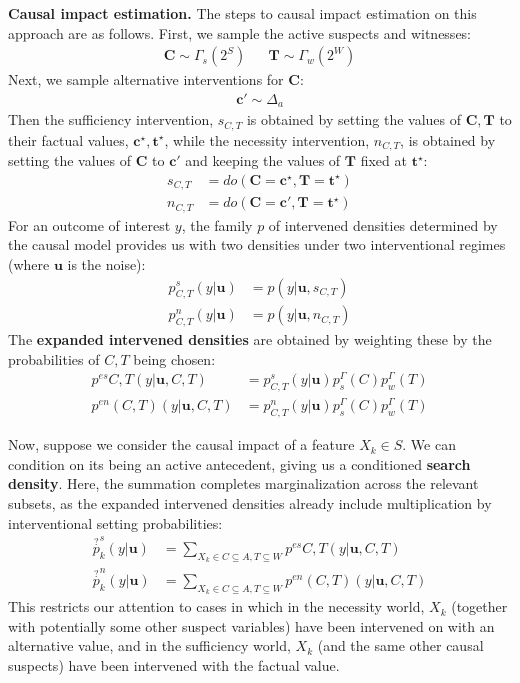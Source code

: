 \documentclass[twoside,11pt]{article}
\begin{document}
\vspace{2mm.}
\noindent \textbf{Causal impact estimation.} 
The steps to causal impact estimation on this approach are as follows. First, we sample the active suspects and witnesses:
\begin{align}
\mathbf{C} \sim \Gamma_s(2^S) & & \mathbf{T} \sim \Gamma_w(2^W)
\end{align}
\noindent Next, we sample alternative interventions for $\mathbf{C}$: 
\begin{align}
\mathbf{c'} \sim \Delta_a
\end{align}
Then the sufficiency intervention, $s_{C,T}$ is obtained by setting the values of $\mathbf{C}, \mathbf{T}$ to their factual values, $\mathbf{c}^\star, \mathbf{t}^\star$, while the necessity intervention, $n_{C, T}$, is obtained by setting the values of $\mathbf{C}$ to $\mathbf{c'}$ and keeping the values of $\mathbf{T}$ fixed at $\mathbf{t}^\star$:
\begin{align}
s_{C,T}  & = do(\mathbf{C} = \mathbf{c^\star}, \mathbf{T} = \mathbf{t^\star}) \\
n_{C,T} & = do(\mathbf{C} = \mathbf{c'}, \mathbf{T} = \mathbf{t^\star})
\end{align}
For an outcome of interest $y$, the family $p$ of intervened densities determined by the causal model provides us with two densities under two interventional regimes (where $\mathbf{u}$ is the noise):
\begin{align}
p^s_{C,T}(y\vert  \mathbf{u}) & = p (y \vert \mathbf{u}, s_{C, T})\\
p^n_{C,T}(y\vert \mathbf{u}) & = p(y \vert \mathbf{u}, n_{C,T})
\end{align} The \textbf{expanded intervened densities} are obtained by weighting these by the probabilities of $C, T$ being chosen:
\begin{align}
p^{es}{C,T}(y \vert \mathbf{u}, C, T) & = p^s_{C,T}(y\vert  \mathbf{u})  p^\Gamma_s(C) p^\Gamma_w(T)\\ 
p^{en}(C, T)( y \vert \mathbf{u}, C, T) & = p^n_{C,T}(y\vert \mathbf{u})    p^\Gamma_s(C) p^\Gamma_w(T)
\end{align}

Now, suppose we consider the causal impact of a feature $X_k \in S$. We can condition on its being an active antecedent, giving us a conditioned  \textbf{search density}. Here, the summation completes marginalization across the relevant subsets, as the expanded intervened densities already include multiplication by interventional setting probabilities:
\begin{align}
\overset{?}{p}^s_k(y \vert \mathbf{u})    &= \sum_{X_k \in C \subseteq A, T\subseteq W} p^{es}{C,T}(y \vert \mathbf{u}, C, T) \\ 
\overset{?}{p}^n_k(y \vert \mathbf{u})   & = \sum_{X_k \in C \subseteq A, T\subseteq W}p^{en}(C, T)( y \vert \mathbf{u}, C, T) 
\end{align}
This restricts our attention to cases in which in the necessity world, $X_k$ (together with potentially some other suspect variables)  have been intervened on with an alternative value, and in the sufficiency world, $X_k$ (and the same other causal suspects) have been intervened with the factual value. 
\end{document}

